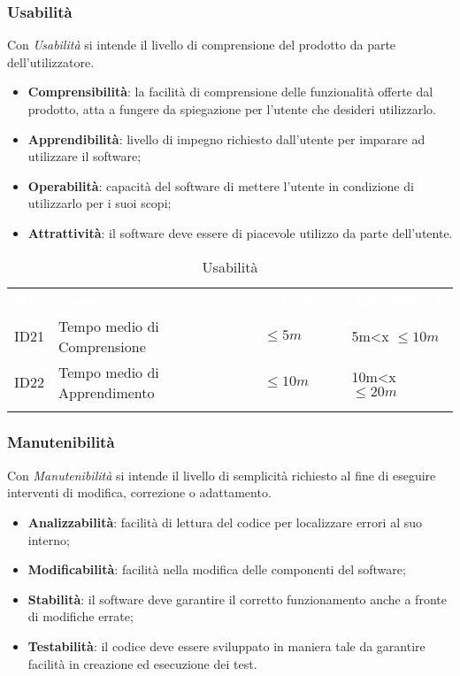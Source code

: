 \subsubsection{Usabilità}

Con \textit{Usabilità} si intende il livello di comprensione del prodotto da parte dell'utilizzatore.

\begin{itemize}
	\item \textbf{Comprensibilità}: la facilità di comprensione delle funzionalità offerte dal prodotto, atta a fungere da spiegazione per l'utente che desideri utilizzarlo. 
	\item \textbf{Apprendibilità}: livello di impegno richiesto dall'utente per imparare ad utilizzare il software;
	\item \textbf{Operabilità}: capacità del software di mettere l'utente in condizione di utilizzarlo per i suoi scopi; 
	\item \textbf{Attrattività}: il software deve essere di piacevole utilizzo da parte dell'utente.
\end{itemize}

\begin{longtable}{|C{.15\textwidth}|C{.24\textwidth}|C{.24\textwidth}|C{.24\textwidth}|}
\hline
{}\textbf{\textcolor{white}{ID}} & \textbf{\textcolor{white}{Nome}} & \textbf{\textcolor{white}{Ottimalità}} & \textbf{\textcolor{white}{Accettabilità}}\\
ID21 & Tempo medio di Comprensione & $\leq 5m$ & 5m<x $\leq 10m$\\
\hline
{}ID22 & Tempo medio di Apprendimento & $\leq 10m$ & 10m<x $\leq 20m$ \\ 
\hline
\caption{Usabilità}
\label{Usabilità}
\end{longtable}

\subsubsection{Manutenibilità}

Con \textit{Manutenibilità} si intende il livello di semplicità richiesto al fine di eseguire interventi di modifica, correzione o adattamento.

\begin{itemize}
	\item \textbf{Analizzabilità}: facilità di lettura del codice per localizzare errori al suo interno; 
	\item \textbf{Modificabilità}: facilità nella modifica delle componenti del software;
	\item \textbf{Stabilità}: il software deve garantire il corretto funzionamento anche a fronte di modifiche errate;
	\item \textbf{Testabilità}: il codice deve essere sviluppato in maniera tale da garantire facilità in creazione ed esecuzione dei test.
\end{itemize}


